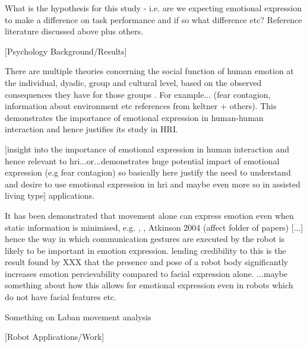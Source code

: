 \documentclass[]{article}
\begin{document}
What is the hypothesis for this study - i.e. are we expecting emotional expression to make a difference on task performance and if so what difference etc? Reference literature discussed above plus others. 

[Psychology Background/Results]

There are multiple theories concerning the social function of human emotion at the individual, dyadic, group and cultural level, based on the observed consequences they have for those groups \cite{keltner1999social}. For example... (fear contagion, information about environment etc references from keltner + others). This demonstrates the importance of emotional expression in human-human interaction and hence justifies its study in HRI. 

[insight into the importance of emotional expression in human interaction and hence relevant to hri...or...demonstrates huge potential impact of emotional expression (e.g fear contagion) so basically here justify the need to understand and desire to use emotional expression in hri and maybe even more so in assisted living type] applications.

It has been demonstrated that movement alone can express emotion even when static information is minimised, e.g. \cite{dittrich1996perception}, \cite{pollick2001perceiving}, Atkinson 2004 (affect folder of papers) [...] hence the way in which communication gestures are executed by the robot is likely to be important in emotion expression. lending credibility to this is the result found by XXX that the presence and pose of a robot body significantly increases emotion percievability compared to facial expression alone. ...maybe something about how this allows for emotional expression even in robots which do not have facial features etc.  

Something on Laban movement analysis

[Robot Applications/Work]
\end{document}

